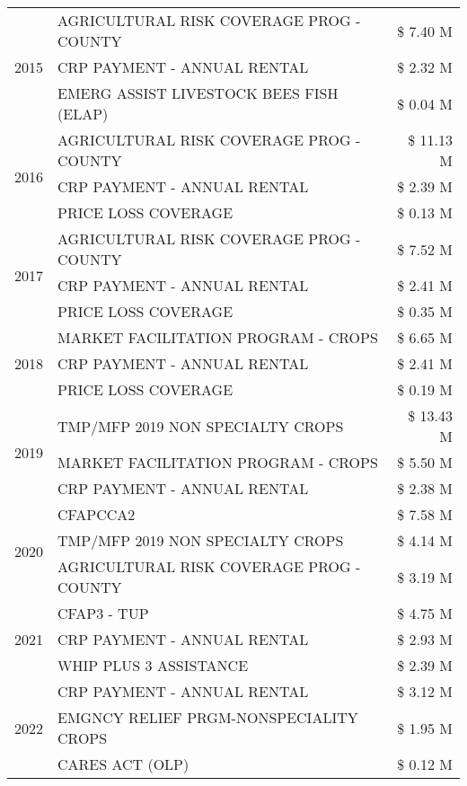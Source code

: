 \begin{tabular}{llr}
\multirow[t]{3}{*}{2015} & AGRICULTURAL RISK COVERAGE PROG - COUNTY & \$ 7.40 M \\
 & CRP PAYMENT - ANNUAL RENTAL & \$ 2.32 M \\
 & EMERG ASSIST LIVESTOCK BEES FISH (ELAP) & \$ 0.04 M \\
\cline{1-3}
\multirow[t]{3}{*}{2016} & AGRICULTURAL RISK COVERAGE PROG - COUNTY & \$ 11.13 M \\
 & CRP PAYMENT - ANNUAL RENTAL & \$ 2.39 M \\
 & PRICE LOSS COVERAGE & \$ 0.13 M \\
\cline{1-3}
\multirow[t]{3}{*}{2017} & AGRICULTURAL RISK COVERAGE PROG - COUNTY & \$ 7.52 M \\
 & CRP PAYMENT - ANNUAL RENTAL & \$ 2.41 M \\
 & PRICE LOSS COVERAGE & \$ 0.35 M \\
\cline{1-3}
\multirow[t]{3}{*}{2018} & MARKET FACILITATION PROGRAM - CROPS & \$ 6.65 M \\
 & CRP PAYMENT - ANNUAL RENTAL & \$ 2.41 M \\
 & PRICE LOSS COVERAGE & \$ 0.19 M \\
\cline{1-3}
\multirow[t]{3}{*}{2019} & TMP/MFP 2019 NON SPECIALTY CROPS & \$ 13.43 M \\
 & MARKET FACILITATION PROGRAM - CROPS & \$ 5.50 M \\
 & CRP PAYMENT - ANNUAL RENTAL & \$ 2.38 M \\
\cline{1-3}
\multirow[t]{3}{*}{2020} & CFAPCCA2 & \$ 7.58 M \\
 & TMP/MFP 2019 NON SPECIALTY CROPS & \$ 4.14 M \\
 & AGRICULTURAL RISK COVERAGE PROG - COUNTY & \$ 3.19 M \\
\cline{1-3}
\multirow[t]{3}{*}{2021} & CFAP3 - TUP & \$ 4.75 M \\
 & CRP PAYMENT - ANNUAL RENTAL & \$ 2.93 M \\
 & WHIP PLUS 3 ASSISTANCE & \$ 2.39 M \\
\cline{1-3}
\multirow[t]{3}{*}{2022} & CRP PAYMENT - ANNUAL RENTAL & \$ 3.12 M \\
 & EMGNCY RELIEF PRGM-NONSPECIALITY CROPS & \$ 1.95 M \\
 & CARES ACT (OLP) & \$ 0.12 M \\
\cline{1-3}
\bottomrule
\end{tabular}
